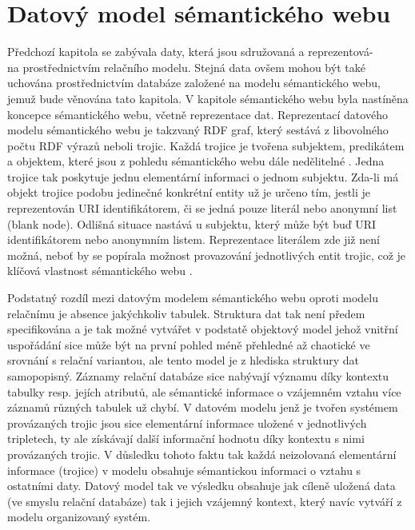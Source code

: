 \documentclass{projekt}
\begin{document}
\chapter{Datový model sémantického webu}
\hspace{0.65cm}Předchozí kapitola se zabývala daty, která jsou sdružovaná a reprezentová-\\na prostřednictvím relačního modelu. Stejná data ovšem mohou být také uchována prostřednictvím databáze založené na modelu sémantického webu, jemuž bude věnována tato kapitola. V kapitole sémantického webu byla nastíněna koncepce sémantického webu, včetně reprezentace dat. Reprezentací datového modelu sémantického webu je takzvaný RDF graf, který sestává z libovolného počtu RDF výrazů neboli trojic. Každá trojice je tvořena subjektem, predikátem a objektem, které jsou z pohledu sémantického webu dále nedělitelné \cite{_8}. Jedna trojice tak poskytuje jednu elementární informaci o jednom subjektu. Zda-li má objekt trojice podobu jedinečné konkrétní entity už je určeno tím, jestli je reprezentován URI identifikátorem, či se jedná pouze literál nebo anonymní list (blank node). Odlišná situace nastává u subjektu, který může být buď URI identifikátorem nebo anonymním listem. Reprezentace literálem zde již není možná, neboť by se popírala možnost provazování jednotlivých entit trojic, což je klíčová vlastnost sémantického webu \cite{_9}.

Podstatný rozdíl mezi datovým modelem sémantického webu oproti modelu relačnímu je absence jakýchkoliv tabulek. Struktura dat tak není předem specifikována a je tak možné vytvářet v podstatě objektový model jehož vnitřní uspořádání sice může být na první pohled méně přehledné až chaotické ve srovnání s relační variantou, ale tento model je z hlediska struktury dat samopopisný. Záznamy relační databáze sice nabývají významu díky kontextu tabulky resp. jejích atributů, ale sémantické informace o vzájemném vztahu více záznamů různých tabulek už chybí. V datovém modelu jenž je tvořen systémem provázaných trojic jsou sice elementární informace uložené v jednotlivých tripletech, ty ale získávají další informační hodnotu díky kontextu s nimi provázaných trojic. V důsledku tohoto faktu tak každá neizolovaná elementární informace (trojice) v modelu obsahuje sémantickou informaci o vztahu s ostatními daty. Datový model tak ve výsledku obsahuje jak cíleně uložená data (ve smyslu relační databáze) tak i jejich vzájemný kontext, který navíc vytváří z modelu organizovaný systém.
\end{document}
